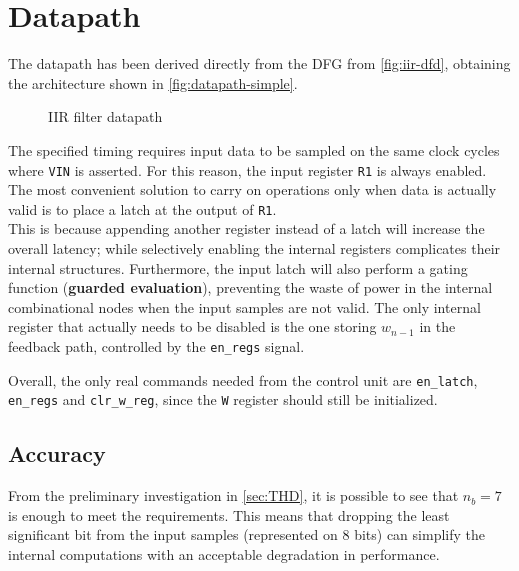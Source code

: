 \section{Datapath}
The datapath has been derived directly from the DFG from \autoref{fig:iir-dfd}, obtaining the architecture shown in \autoref{fig:datapath-simple}.

\begin{figure}[htbp]
	\centering
	\caption{IIR filter datapath}
	\label{fig:datapath-simple}
\end{figure}

The specified timing requires input data to be sampled on the same clock cycles where \texttt{VIN} is asserted. For this reason, the input register \texttt{R1} is always enabled. The most convenient solution to carry on operations only when data is actually valid is to place a latch at the output of \texttt{R1}.\\
This is because appending another register instead of a latch will increase the overall latency; while selectively enabling the internal registers complicates their internal structures. Furthermore, the input latch will also perform a gating function (\textbf{guarded evaluation}), preventing the waste of power in the internal combinational nodes when the input samples are not valid. The only internal register that actually needs to be disabled is the one storing $w_{n-1}$ in the feedback path, controlled by the \texttt{en\_regs} signal.

Overall, the only real commands needed from the control unit are \texttt{en\_latch}, \texttt{en\_regs} and \texttt{clr\_w\_reg}, since the \texttt{W} register should still be initialized.

\subsection{Accuracy}
From the preliminary investigation in \autoref{sec:THD}, it is possible to see that $n_b=7$ is enough to meet the requirements. This means that dropping the least significant bit from the input samples (represented on 8 bits) can simplify the internal computations with an acceptable degradation in performance.

